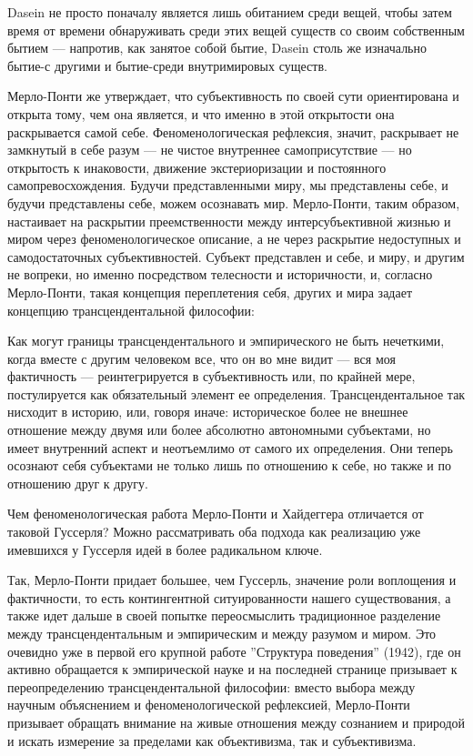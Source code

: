 \documentclass[11pt]{book}
\begin{document}
Dasein не просто поначалу является лишь обитанием среди вещей, чтобы затем время от времени обнаруживать среди этих вещей существ со своим собственным бытием --- напротив, как занятое собой бытие, Dasein столь же изначально бытие-с другими и бытие-среди внутримировых существ.

\relax
{}\relax
\smallskip

Мерло-Понти же утверждает, что субъективность по своей сути ориентирована и открыта тому, чем она является, и что именно в этой открытости она раскрывается самой себе. Феноменологическая рефлексия, значит, раскрывает не замкнутый в себе разум --- не чистое внутреннее самоприсутствие --- но открытость к инаковости, движение экстериоризации и постоянного самопревосхождения. Будучи представленными миру, мы представлены себе, и будучи представлены себе, можем осознавать мир. Мерло-Понти, таким образом, настаивает на раскрытии преемственности между интерсубъективной жизнью и миром через феноменологическое описание, а не через раскрытие недоступных и самодостаточных субъективностей. Субъект представлен и себе, и миру, и другим не вопреки, но именно посредством телесности и историчности, и, согласно Мерло-Понти, такая концепция переплетения себя, других и мира задает концепцию трансцендентальной философии:

\smallskip
{}\relax
{}\relax

Как могут границы трансцендентального и эмпирического не быть нечеткими, когда вместе с другим человеком все, что он во мне видит --- вся моя фактичность --- реинтегрируется в субъективность или, по крайней мере, постулируется как обязательный элемент ее определения. Трансцендентальное так нисходит в историю, или, говоря иначе: историческое более не внешнее отношение между двумя или более абсолютно автономными субъектами, но имеет внутренний аспект и неотъемлимо от самого их определения. Они теперь осознают себя субъектами не только лишь по отношению к себе, но также и по отношению друг к другу.

\relax
{}\relax
\smallskip

Чем феноменологическая работа Мерло-Понти и Хайдеггера отличается от таковой Гуссерля? Можно рассматривать оба подхода как реализацию уже имевшихся у Гуссерля идей в более радикальном ключе.

Так, Мерло-Понти придает большее, чем Гуссерль, значение роли воплощения и фактичности, то есть контингентной ситуированности нашего существования, а также идет дальше в своей попытке переосмыслить традиционное разделение между трансцендентальным и эмпирическим и между разумом и миром. Это очевидно уже в первой его крупной работе ''Структура поведения'' (1942), где он активно обращается к эмпирической науке и на последней странице призывает к переопределению трансцендентальной философии: вместо выбора между научным объяснением и феноменологической рефлексией, Мерло-Понти призывает обращать внимание на живые отношения между сознанием и природой и искать измерение за пределами как объективизма, так и субъективизма.
\end{document}
